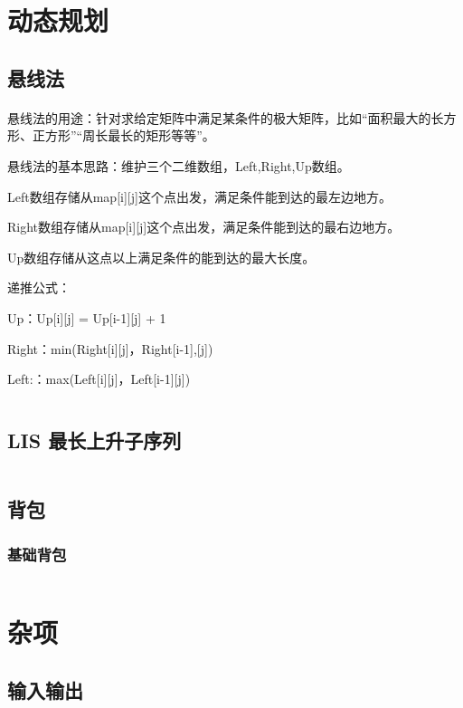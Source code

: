 \documentclass[a4paper,11pt]{article}
\begin{document}
\section{动态规划}
\subsection{悬线法}
\paragraph{}
悬线法的用途：针对求给定矩阵中满足某条件的极大矩阵，比如“面积最大的长方形、正方形”“周长最长的矩形等等”。

悬线法的基本思路：维护三个二维数组，Left,Right,Up数组。

Left数组存储从map[i][j]这个点出发，满足条件能到达的最左边地方。

Right数组存储从map[i][j]这个点出发，满足条件能到达的最右边地方。

Up数组存储从这点以上满足条件的能到达的最大长度。

递推公式：

Up：Up[i][j] = Up[i-1][j] + 1

Right：min(Right[i][j]，Right[i-1],[j])

Left:：max(Left[i][j]，Left[i-1][j])
\inputminted[breaklines,linenos,frame=leftline]{c++}{DP/StretchedWire.cpp}

\subsection{LIS 最长上升子序列}
\inputminted[breaklines,linenos,frame=leftline]{c++}{DP/lis.cpp}

\subsection{背包}
\subsubsection{基础背包}
\inputminted[breaklines,linenos,frame=leftline]{c++}{DP/pack.cpp}

\newpage
\section{杂项}

\subsection{输入输出}
\end{document}
